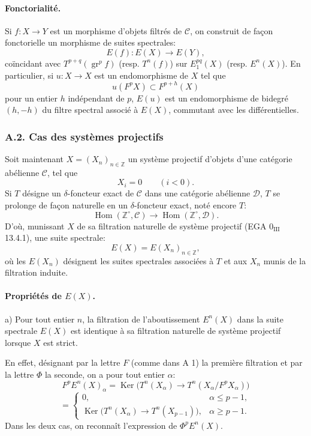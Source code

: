 \documentclass[11pt]{article}
\DeclareMathOperator{\Hom}{Hom}
\providecommand{\Ker}{\operatorname{Ker}}
\providecommand{\gr}{\operatorname{gr}}
\providecommand{\Hom}{\operatorname{Hom}}
\providecommand{\Ker}{\operatorname{Ker}}
\providecommand{\gr}{\operatorname{gr}}
\providecommand{\gr}{\operatorname{gr}}
\providecommand{\Ker}{\operatorname{Ker}}
\providecommand{\Hom}{\operatorname{Hom}}
\begin{document}
\paragraph{Fonctorialité.}
Si \(f:X\to Y\) est un morphisme d'objets filtrés de \(\mathcal C\), on construit de façon fonctorielle un morphisme de suites spectrales:
\[
E(f):E(X)\longrightarrow E(Y),
\]
coïncidant avec \(T^{p+q}(\gr^p f)\) (resp. \(T^n(f)\)) sur \(E_1^{pq}(X)\) (resp. \(E^n(X)\)). En particulier, si \(u:X\to X\) est un endomorphisme de \(X\) tel que
\[
u(F^pX)\subset F^{p+h}(X)
\]
pour un entier \(h\) indépendant de \(p\), \(E(u)\) est un endomorphisme de bidegré \((h,-h)\) du filtre spectral associé à \(E(X)\), commutant avec les différentielles.

\subsubsection*{A.2. Cas des systèmes projectifs}
Soit maintenant \(X=(X_n)_{n\in\mathbb Z}\) un système projectif d'objets d'une catégorie abélienne \(\mathcal C\), tel que
\[
X_i=0\qquad(i<0).
\]
Si \(T\) désigne un \(\delta\)-foncteur exact de \(\mathcal C\) dans une catégorie abélienne \(\mathcal D\), \(T\) se prolonge de façon naturelle en un \(\delta\)-foncteur exact, noté encore \(T\):
\[
\Hom(\mathbb Z^\circ,\mathcal C)\longrightarrow \Hom(\mathbb Z^\circ,\mathcal D).
\]
D'où, munissant \(X\) de sa filtration naturelle de système projectif (EGA \(0_{\mathrm{III}}\) 13.4.1), une suite spectrale:
\[
E(X)=E(X_n)_{n\in\mathbb Z},
\]
où les \(E(X_n)\) désignent les suites spectrales associées à \(T\) et aux \(X_n\) munis de la filtration induite.

\paragraph{Propriétés de \(E(X)\).}
a) Pour tout entier \(n\), la filtration de l'aboutissement \(E^n(X)\) dans la suite spectrale \(E(X)\) est identique à sa filtration naturelle de système projectif lorsque \(X\) est strict.

En effet, désignant par la lettre \(F\) (comme dans A 1) la première filtration et par la lettre \(\Phi\) la seconde, on a pour tout entier \(\alpha\):
\[
F^pE^n(X)_\alpha
=\Ker\bigl(T^n(X_\alpha)\longrightarrow T^n(X_\alpha/F^pX_\alpha)\bigr)
\]
\[
=
\begin{cases}
0,& \alpha\le p-1,\\
\Ker\bigl(T^n(X_\alpha)\longrightarrow T^n(X_{p-1})\bigr),& \alpha\ge p-1.
\end{cases}
\]
Dans les deux cas, on reconnaît l'expression de \(\Phi^pE^n(X)\).
\end{document}
